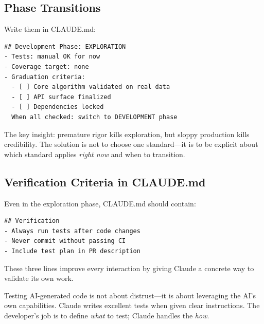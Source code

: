 \subsection{Phase Transitions}

 Write them in CLAUDE.md:

\begin{verbatim}
## Development Phase: EXPLORATION
- Tests: manual OK for now
- Coverage target: none
- Graduation criteria:
  - [ ] Core algorithm validated on real data
  - [ ] API surface finalized
  - [ ] Dependencies locked
  When all checked: switch to DEVELOPMENT phase
\end{verbatim}

The key insight: premature rigor kills exploration,
but sloppy production kills credibility.
The solution is not to choose one standard---it is to be explicit about
which standard applies \emph{right now} and when to transition.

\subsection{Verification Criteria in CLAUDE.md}

Even in the exploration phase, CLAUDE.md should contain:

\begin{verbatim}
## Verification
- Always run tests after code changes
- Never commit without passing CI
- Include test plan in PR description
\end{verbatim}

These three lines improve every interaction by giving Claude
a concrete way to validate its own work.

\begin{keyinsight}
Testing AI-generated code is not about distrust---it is about
leveraging the AI's own capabilities. Claude writes excellent tests
when given clear instructions. The developer's job is to define
\emph{what} to test; Claude handles the \emph{how}.
\end{keyinsight}
